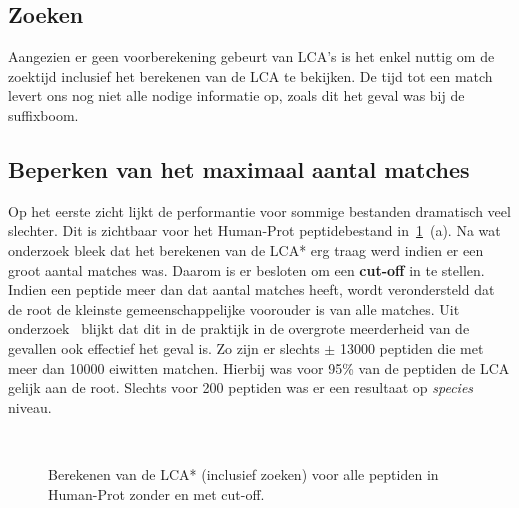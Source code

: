 \subsection{Zoeken}
Aangezien er geen voorberekening gebeurt van LCA's is het enkel nuttig om de zoektijd inclusief het berekenen van de LCA te bekijken.
De tijd tot een match levert ons nog niet alle nodige informatie op, zoals dit het geval was bij de suffixboom.

\subsection{Beperken van het maximaal aantal matches}\label{subsec:maximaal-aantal-matches}
Op het eerste zicht lijkt de performantie voor sommige bestanden dramatisch veel slechter.
Dit is zichtbaar voor het Human-Prot peptidebestand in~\ref{fig:cutoff_humanprot}~(a).
Na wat onderzoek bleek dat het berekenen van de LCA* erg traag werd indien er een groot aantal matches was.
Daarom is er besloten om een \textbf{cut-off} in te stellen.
Indien een peptide meer dan dat aantal matches heeft, wordt verondersteld dat de root de kleinste gemeenschappelijke voorouder is van alle matches.
Uit onderzoek~\cite{unipept_cutoff} blijkt dat dit in de praktijk in de overgrote meerderheid van de gevallen ook effectief het geval is.
Zo zijn er slechts $\pm$ 13000 peptiden die met meer dan 10000 eiwitten matchen.
Hierbij was voor 95\% van de peptiden de LCA gelijk aan de root.
Slechts voor 200 peptiden was er een resultaat op \textit{species} niveau.
\\
\begin{figure}[H]
    \centering
    \\[4ex] %

    \caption{Berekenen van de LCA* (inclusief zoeken) voor alle peptiden in Human-Prot zonder en met cut-off.}\label{fig:cutoff_humanprot}
\end{figure}

